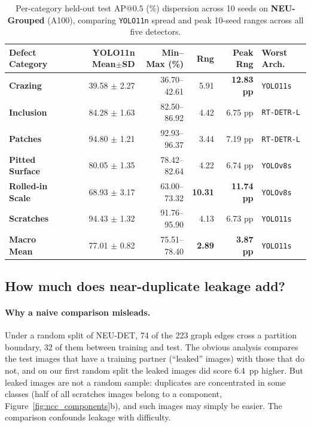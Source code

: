 \documentclass[pdflatex,sn-apa]{sn-jnl}
\begin{document}
\begin{table}[htbp]
\centering
\footnotesize
\setlength{\tabcolsep}{3pt}
\caption{Per-category held-out test $\text{AP@0.5}$ (\%) dispersion across 10 seeds on \textbf{NEU-Grouped} (A100), comparing \texttt{YOLO11n} spread and peak 10-seed ranges across all five detectors.}
\label{tab:per_class}
\begin{tabularx}{\textwidth}{>{\raggedright\arraybackslash}X r r r r l}
\toprule
\textbf{Defect Category} & \textbf{YOLO11n Mean$\pm$SD} & \textbf{Min--Max (\%)} & \textbf{Rng} & \textbf{Peak Rng} & \textbf{Worst Arch.} \\
\midrule
\textbf{Crazing} & 39.58 $\pm$ 2.27 & 36.70--42.61 & 5.91 & \textbf{12.83 pp} & \texttt{YOLO11s} \\
\textbf{Inclusion} & 84.28 $\pm$ 1.63 & 82.50--86.92 & 4.42 & 6.75 pp & \texttt{RT-DETR-L} \\
\textbf{Patches} & 94.80 $\pm$ 1.21 & 92.93--96.37 & 3.44 & 7.19 pp & \texttt{RT-DETR-L} \\
\textbf{Pitted Surface} & 80.05 $\pm$ 1.35 & 78.42--82.64 & 4.22 & 6.74 pp & \texttt{YOLOv8s} \\
\textbf{Rolled-in Scale} & 68.93 $\pm$ 3.17 & 63.00--73.32 & \textbf{10.31} & \textbf{11.74 pp} & \texttt{YOLOv8s} \\
\textbf{Scratches} & 94.43 $\pm$ 1.32 & 91.76--95.90 & 4.13 & 6.73 pp & \texttt{YOLO11s} \\
\midrule
\textbf{Macro Mean} & 77.01 $\pm$ 0.82 & 75.51--78.40 & \textbf{2.89} & \textbf{3.87 pp} & \texttt{YOLO11s} \\
\bottomrule
\end{tabularx}
\end{table}

\subsection{How much does near-duplicate leakage add?}\label{sec:counterfactual}\label{sec:leakage_ablation}

\paragraph{Why a naive comparison misleads.} Under a random split of NEU-DET, 74 of the 223 graph edges cross a partition boundary, 32 of them between training and test. The obvious analysis compares the test images that have a training partner (``leaked'' images) with those that do not, and on our first random split the leaked images did score 6.4~pp higher. But leaked images are not a random sample: duplicates are concentrated in some classes (half of all scratches images belong to a component, Figure~\ref{fig:ncc_components}b), and such images may simply be easier. The comparison confounds leakage with difficulty.
\end{document}
